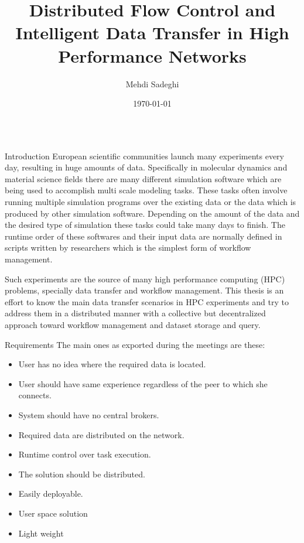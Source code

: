 \documentclass[final,hyperref={pdfpagelabels=true}]{beamer}
\title[Communication and Media Engineering]{Distributed Flow Control and Intelligent Data Transfer in High Performance Networks}
\author[msadeghi@stud.hs-offenburg.de]{Mehdi Sadeghi}
\institute[]{%
  Hochschule für Technik, Wirtschaft und Medien Offenburg\\[0.25\baselineskip]
  Fakultät Medien und Informationswesen\\[0.25\baselineskip]
  Professorin: Dr. Katharina Mehner-Heindl\\[0.25\baselineskip]
  Betreuer: Dr. Adham Hashibon
}
\date[\today]{\today}
\begin{document}
\begin{frame}
  \begin{columns}[t]
    \begin{column}{.45\textwidth}
      \begin{block}{Introduction}
European scientific communities launch many experiments every day, resulting in huge amounts
of data. Specifically in molecular dynamics and material science fields there are many different
simulation software which are being used to accomplish multi scale modeling tasks. These tasks
often involve running multiple simulation programs over the existing data or the data which is
produced by other simulation software. Depending on the amount of the data and the desired type of simulation
these tasks could take many days to finish. The runtime order of these softwares and 
their input data are normally defined in scripts written by researchers which is the simplest
form of workflow management.

Such experiments are the source of many high performance computing (HPC) problems, specially data transfer
and workflow management. This thesis is an effort to know the main data transfer scenarios in HPC experiments 
and try to address them in a distributed manner with a collective but decentralized approach toward workflow management
and dataset storage and query.

      \end{block}
      
      \begin{block}{Requirements}
      The main ones as exported during the meetings are these:
        \begin{itemize}
        \item User has no idea where the required data is located.
        \item User should have same experience regardless of the peer to which she connects.
        \item System should have no central brokers.
        \item Required data are distributed on the network.
        \item Runtime control over task execution.
        \item The solution should be distributed.
        \item Easily deployable.
        \item User space solution
        \item Light weight
        \end{itemize}
      \end{block}
    \end{column}


\end{columns}
\end{frame}
\end{document}

